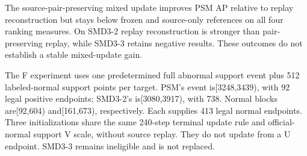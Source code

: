 \documentclass[
  english,
  9pt,
]{article}
\begin{document}
The source-pair-preserving mixed update improves PSM AP relative to
replay reconstruction but stays below frozen and source-only references
on all four ranking measures. On SMD3-2 replay reconstruction is
stronger than pair-preserving replay, while SMD3-3 retains negative
results. These outcomes do not establish a stable mixed-update gain.

The F experiment uses one predetermined full abnormal support event plus
512 labeled-normal support points per target. PSM's event
is{[}3248,3439), with 92 legal positive endpoints; SMD3-2's
is{[}3080,3917), with 738. Normal blocks are{[}92,604) and{[}161,673),
respectively. Each supplies 413 legal normal endpoints. Three
initializations share the same 240-step terminal update rule and
official-normal support V scale, without source replay. They do not
update from a U endpoint. SMD3-3 remains ineligible and is not replaced.
\end{document}
